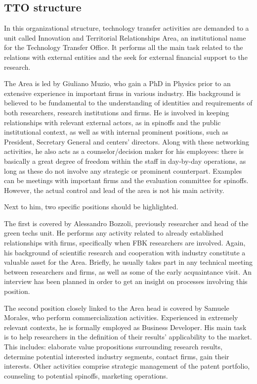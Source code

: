 \subsection{TTO structure}

In this organizational structure, technology transfer activities are demanded to a unit called Innovation and Territorial Relationships Area, an institutional name for the Technology Transfer Office. It performs all the main task related to the relations with external entities and the seek for external financial support to the research.

The Area is led by Giuliano Muzio, who gain a PhD in Physics prior to an extensive experience in important firms in various industry. His background is believed to be fundamental to the understanding of identities and requirements of both researchers, research institutions and firms. He is involved in keeping relationships with relevant external actors, as in spinoffs and the public institutional context, as well as with internal prominent positions, such as President, Secretary General and centers' directors. Along with these networking activities, he also acts as a counselor/decision maker for his employees: there is basically a great degree of freedom within the staff in day-by-day operations, as long as these do not involve any strategic or prominent counterpart. Examples can be meetings with important firms and the evaluation committee for spinoffs. However, the actual control and lead of the area is not his main activity.

Next to him, two specific positions should be highlighted.

The first is covered by Alessandro Bozzoli, previously researcher and head of the green techs unit. He performs any activity related to already established relationships with firms, specifically when FBK researchers are involved. Again, his background of scientific research and cooperation with industry constitute a valuable asset for the Area. Briefly, he usually takes part in any technical meeting between researchers and firms, as well as some of the early acquaintance visit. An interview has been planned in order to get an insight on processes involving this position.

The second position closely linked to the Area head is covered by Samuele Morales, who perform commercialization activities. Experienced in extremely relevant contexts, he is formally employed as Business Developer. His main task is to help researchers in the definition of their results’ applicability to the market. This includes: elaborate value propositions surrounding research results, determine potential interested industry segments, contact firms, gain their interests. Other activities comprise strategic management of the patent portfolio, counseling to potential spinoffs, marketing operations.

